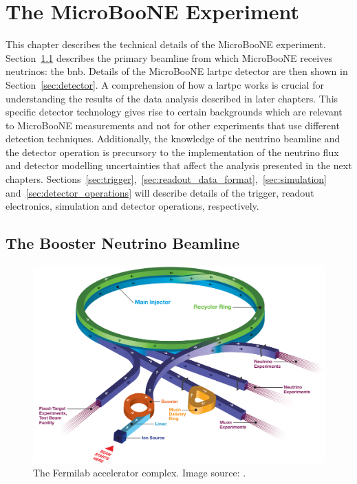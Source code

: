 \chapter{The MicroBooNE Experiment}
\label{ch:microboone}

This chapter describes the technical details of the MicroBooNE experiment. Section~\ref{sec:bnb} describes the primary beamline from which MicroBooNE receives neutrinos: the \acrfull{bnb}. Details of the MicroBooNE \acrshort{lartpc} detector are then shown in Section~\ref{sec:detector}.
A comprehension of how a \acrshort{lartpc} works is crucial for understanding the results of the data analysis described in later chapters. This specific detector technology gives rise to certain backgrounds  which are relevant to MicroBooNE measurements and not for other experiments that use different detection techniques. Additionally, the knowledge of the neutrino beamline and the detector operation is precursory to the implementation of the neutrino flux and detector modelling uncertainties that affect the analysis presented in the next chapters. Sections~\ref{sec:trigger},~\ref{sec:readout_data_format},~\ref{sec:simulation} and~\ref{sec:detector_operations} will describe details of the trigger, readout electronics, simulation and detector operations, respectively.


\section{The Booster Neutrino Beamline}
\label{sec:bnb}

\begin{figure}[]
\centering
\includegraphics[width=.80\textwidth]{images/MicroBooNE/accelerator-chain}
\caption[Fermilab Accelerator Complex]{The Fermilab accelerator complex. Image source: \cite{doe}.}
\label{fig:accelerator-chain}
\end{figure}

